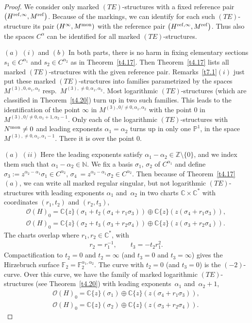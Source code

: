 \documentclass[pdftex]{sigma}%
\numberwithin{equation}{section}
\numberwithin{figure}{section}
\newcommand{\N}{{\mathbb N}}
\newcommand{\Z}{{\mathbb Z}}
\newcommand{\C}{{\mathbb C}}
\renewcommand{\P}{{\mathbb P}}
\newcommand{\F}{{\mathbb F}}
\newcommand{\OO}{{\mathcal O}}
\begin{document}
\begin{proof}
We consider only marked $(TE)$-structures with a
fixed reference pair $\big(H^{{\rm ref},\infty},M^{\rm ref}\big)$.
Because of the markings, we can identify for each such
$(TE)$-structure its pair $(H^\infty,M^{\rm mon})$
with the reference pair $\big(H^{{\rm ref},\infty},M^{\rm ref}\big)$.
Thus also the spaces $C^\alpha$ can be identified
for all marked $(TE)$-structures.

$(a)$ $(i)$ and $(b)$ In both parts, there is no harm in fixing
elementary sections $s_1\in C^{\alpha_1}$ and
$s_2\in C^{\alpha_2}$ as in Theorem~\ref{t4.17}.
Then Theorem~\ref{t4.17} lists all marked $(TE)$-structures
with the given reference pair.
Remarks~\ref{t7.1}$(i)$ just put these marked
$(TE)$-structures into families parametrized by the spaces
$M^{(3),0,\alpha_1,\alpha_2}$ resp.~$M^{(3),\neq 0,\alpha_1,\alpha_2}$.
Most logarithmic $(TE)$-structures (which are classified
in Theorem~\ref{t4.20}) turn up in two such
families. This leads to the identification of the point
$\infty$ in $M^{(3),0/\neq 0,\alpha_1,\alpha_2}$
with the point $0$ in
$M^{(3),0/\neq 0,\alpha_1+1,\alpha_2-1}$.
Only each of the logarithmic $(TE)$-structures
with $N^{\rm mon}\neq 0$ and leading exponents
$\alpha_1=\alpha_2$ turns up in only one $\P^1$,
in the space $M^{(3),\neq 0,\alpha_1,\alpha_1-1}$.
There it is over the point $0$.


$(a)$ $(ii)$ Here the leading exponents satisfy
$\alpha_1-\alpha_2\in\Z\setminus\{0\}$, and we index them
such that $\alpha_1-\alpha_2\in\N$. We fix a basis
$\sigma_1$, $\sigma_2$ of $C^{\alpha_1}$
and define $\sigma_3:=z^{\alpha_2-\alpha_1}\sigma_1\in
C^{\alpha_2}$,
$\sigma_4\:=z^{\alpha_2-\alpha_1}\sigma_2\in C^{\alpha_2}$.
Then because of Theorem~\ref{t4.17}$(a)$,
we can write all marked regular singular, but not
logarithmic $(TE)$-structures with leading exponents
$\alpha_1$ and~$\alpha_2$ in two charts $\C\times\C^*$
with coordinates $(r_1,t_2)$ and $(r_2,t_3)$,
\begin{gather*}%
\OO(H)_0= \C\{z\}(\sigma_1+t_2(\sigma_4+r_1\sigma_3))\oplus \C\{z\}(z(\sigma_4+r_1\sigma_3)),
\\
\OO(H)_0= \C\{z\}(\sigma_2+t_3(\sigma_3+r_2\sigma_4))\oplus \C\{z\}(z(\sigma_3+r_2\sigma_4)).\nonumber
\end{gather*}
The charts overlap where $r_1,r_2\in\C^*$, with
\begin{gather*}%
r_2=r_1^{-1},\qquad
t_3=-t_2r_1^2.
\end{gather*}
Compactification to $t_2= 0$ and $t_2=\infty$
(and $t_3=0$ and $t_3=\infty$) gives
the Hirzebruch surface $\F_2=\F_2^{\alpha_1,\alpha_2}$.
The curve with $t_2=0$ (and $t_3=0$) is the $(-2)$-curve.
Over this curve, we have the family of marked logarithmic
$(TE)$-structures (see Theorem~\ref{t4.20}) with
leading exponents~$\alpha_1$ and~$\alpha_2+1$,
\begin{gather*}
\OO(H)_0= \C\{z\}(\sigma_1)\oplus \C\{z\}(z(\sigma_4+r_1\sigma_3)),
\\
\OO(H)_0= \C\{z\}(\sigma_2)\oplus \C\{z\}(z(\sigma_3+r_2\sigma_4)).
\end{gather*}


\end{proof}
\end{document}
